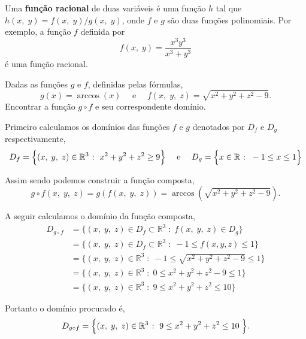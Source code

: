Uma \textbf{função racional} de duas variáveis é uma função \(h\) tal que \(h(x,\; y) =f(x,\; y)/g(x,\; y)\), onde \(f\) e \(g\) são duas funções 
polinomiais. Por exemplo, a função \(f\) definida por
\begin{equation*}
	f(x,\; y)=\dfrac{x^{3}y^{3}}{x^{3}+y^{3}}
\end{equation*}
é uma função racional.


\begin{exer}\label{exe:2-3}
	Dadas as funções $g$ e $f$, definidas pelas fórmulas,
	\begin{equation*}
		g(x)=\arccos(x)\quad \text{ e }\quad f(x,\; y,\; z)=\sqrt{x^2+y^2+z^2-9}.
	\end{equation*}
	Encontrar a função $g\circ f$ e seu correspondente domínio.
\end{exer}

\solo
Primeiro calculamos os domínios das funções $f$ e $g$ denotados por $D_f$ e $D_g$ respectivamente,
\begin{equation*}
	D_f=\Bigl\{(x,\; y,\; z)\in \mathbb{R}^3 \; \colon\; x^2+y^2+z^2\geq 9 \Bigr\} \quad \text{ e } \quad D_g=\Bigl\{ x\in \mathbb{R} \; \colon\; -1 \leq x \leq 1 \Bigr\}
\end{equation*}

Assim sendo podemos construir a função composta,
\begin{equation*}
	g\circ f(x,\; y,\; z)=g\left(f(x,\; y,\; z)\right)=\arccos\left(\sqrt{x^2+y^2+z^2-9}\right).
\end{equation*}

A  seguir calculamos o domínio da função composta,
\begin{align*}
	D_{g\circ f}&=\{(x,\; y,\; z)\in D_f\subset \mathbb{R}^3  \; \colon\;  f(x,\; y,\; z)\in D_g \}\\[2pt]
	& =\{(x,\; y,\; z)\in D_f\subset \mathbb{R}^3 \; \colon \; -1\leq f(x,y,z)\leq 1 \}\\[2pt]
	&=\{(x,\; y,\; z)\in \mathbb{R}^3 \; \colon\;  -1\leq \sqrt{x^2+y^2+z^2-9} \leq 1 \}\\[2pt]
	&=\{(x,\; y,\; z)\in \mathbb{R}^3\; \colon\; 0 \leq x^2+y^2+z^2-9 \leq 1 \}\\[2pt]
	&=\{(x,\; y,\; z)\in \mathbb{R}^3\; \colon\;  9 \leq x^2+y^2+z^2\leq 10 \}
\end{align*}

Portanto o domínio procurado é,
\begin{equation*}
	D_{g\circ f}=\Bigl\{(x,\; y,\; z)\in \mathbb{R}^3 \; \colon \;  9 \leq x^2+y^2+z^2\leq 10\; \Bigr\}.
\end{equation*}

